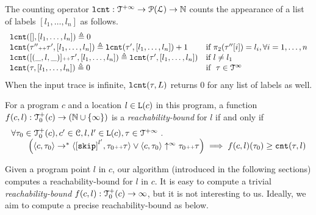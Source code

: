 \begin{defn}
 \label{def:lcounter}
 The counting operator $\mathtt{lcnt} : \mathcal{T}^{+\infty} \to \mathcal{P}(\mathcal{L}) \to \mathbb{N}$
 counts the appearance of a list of labels $[l_1, \ldots, l_n]$ as follows.
\[
 \begin{array}{ll}
\mathtt{lcnt}([], [l_1, \ldots, l_n] ) 
\triangleq 0 & 
\\ 
\mathtt{lcnt}(\mathtt{\tau}'' {\scriptscriptstyle ++} \mathtt{\tau}', [l_1, \ldots, l_n] ) 
 \triangleq \mathtt{lcnt}(\mathtt{\tau}', [l_1, \ldots, l_n]) + 1 & \text{if}~ \pi_2(\mathtt{\tau}''[i]) = l_i, \forall i = 1, \ldots, n
 \\ 
 \mathtt{lcnt}([(\_, l, \_)] {\scriptscriptstyle ++} \mathtt{\tau}', [l_1, \ldots, l_n] ) 
 \triangleq \mathtt{lcnt}(\mathtt{\tau}', [l_1, \ldots, l_n]) & \text{if}~ l \neq l_1
 \\ 
 \mathtt{lcnt}(\mathtt{\tau}, [l_1, \ldots, l_n] ) 
 \triangleq 0 & \text{if }~ \mathtt{\tau} \in \mathcal{T}^{\infty}
\end{array}
\]
{When the input trace is infinite, $\mathtt{lcnt}(\mathtt{\tau}, L)$ returns $0$ for any list of labels as well.}
\end{defn}
%
%
\begin{defn}
 \label{def:rb}
 For a program ${c}$ and a location $l \in \mathtt{L}(c)$ in this program,
a function $f(c, l) : \mathcal{T}^{+}_0(c) \to (\mathbb{N} \cup \{\infty\})$ is a \emph{reachability-bound} for $l$ if and only if
\[
 \begin{array}{l}
 \forall \trace_0 \in \ftdom_0(c), c' \in \cdom, l, l' \in \progl(c), \trace \in \tdom \st 
 \\ \qquad
 \Big(
 \config{{c}, \trace_0} \to^{*} \config{\clabel{\eskip}^{l'}, \trace_0 \tracecat \trace} 
 \lor 
 \config{{c}, \trace_0} \uparrow^{\infty} \trace_0 \tracecat \trace 
 \Big)
 \implies f({c}, l)(\trace_0) \geq \counter(\trace, l) 
 \end{array}
 \]
\end{defn}
Given a program point $l$ in $c$, our algorithm (introduced in the following sections) computes a reachability-bound for $l$ in $c$.
It is easy to compute a trivial \emph{reachability-bound} $f(c, l): \mathcal{T}^{+}_0(c) \to \infty$, but it is not interesting to us.
Ideally, we aim to compute a precise reachability-bound as below.

